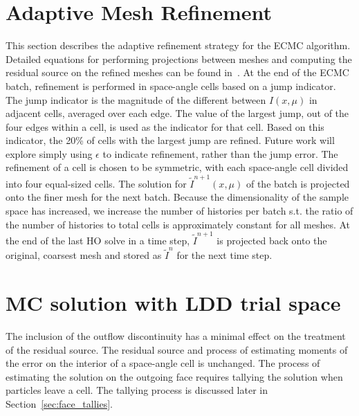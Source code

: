 \section{Adaptive Mesh Refinement}
\label{app:refinement}
This section describes the adaptive refinement strategy for the ECMC algorithm.
Detailed equations for performing projections between meshes and computing the residual source on
the refined meshes can be found in~\cite{jake}.  At the end of the ECMC batch,
refinement is performed in space-angle cells based on a jump indicator.  The jump
indicator is the magnitude of the different between $I(x,\mu)$ in adjacent cells,
averaged over each edge.  The value of the largest jump, out of the four edges within a
cell, is used as the
indicator for that cell.  Based on this indicator, the 20\% of cells with the largest jump are
refined.  Future work will explore simply using $\epsilon$ to indicate refinement,
rather than the jump error.  The refinement of a cell is chosen to be symmetric, with each space-angle cell divided into four
equal-sized cells.  The solution for $\tilde{I}^{n+1}(x,\mu)$ of the batch is projected onto
the finer mesh for the next batch. Because the dimensionality of the sample space has
increased, we increase the number of histories per batch s.t. the ratio of the number
of histories to total cells is approximately constant for all meshes.  At the end of the last HO solve in a time step,
$\tilde{I}^{n+1}$ is projected back onto the original, coarsest mesh and stored as
$\tilde{I}^{n}$ for the next time step.


\section{MC solution with LDD trial space}
\label{sec:ldd_mc}

The inclusion of the outflow discontinuity has a minimal effect on the treatment of the
residual source. The residual source and process of estimating moments of
the error on the interior of a space-angle cell is unchanged.  The process of estimating
the solution on the outgoing face requires tallying the solution when particles leave a
cell. The tallying process is discussed later in Section~\ref{sec:face_tallies}.  

